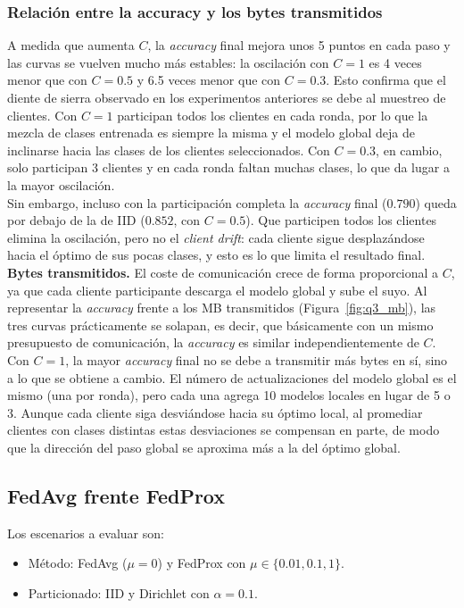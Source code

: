\subsubsection{Relación entre la accuracy y los bytes transmitidos}
A medida que aumenta $C$, la \textit{accuracy} final mejora unos 5 puntos en cada
paso y las curvas se vuelven mucho más estables: la oscilación con $C=1$
es 4 veces menor que con $C=0.5$ y 6.5 veces menor que con $C=0.3$. Esto confirma que el diente de sierra 
observado en los experimentos anteriores se debe al muestreo de clientes. Con $C=1$ participan todos los clientes 
en cada ronda, por lo que la mezcla de clases entrenada es siempre la misma y el modelo global deja de inclinarse 
hacia las clases de los clientes seleccionados. Con $C=0.3$, en cambio, solo participan 3 clientes y en cada ronda 
faltan muchas clases, lo que da lugar a la mayor oscilación.
\\

Sin embargo, incluso con la participación completa la \textit{accuracy} final ($0.790$) queda por debajo de la de
IID ($0.852$, con $C=0.5$). Que participen todos los clientes elimina la oscilación, pero no el \textit{client
drift}: cada cliente sigue desplazándose hacia el óptimo de sus pocas clases, y esto es lo que limita el resultado
final.
\\

\textbf{Bytes transmitidos.} El coste de comunicación crece de forma proporcional a $C$, ya que cada cliente
participante descarga el modelo global y sube el suyo. Al representar la \textit{accuracy} frente a los MB 
transmitidos (Figura~\ref{fig:q3_mb}), las tres curvas prácticamente se solapan, es decir, que básicamente 
con un mismo presupuesto de comunicación, la \textit{accuracy} es similar independientemente de $C$.
\\

Con $C=1$, la mayor \textit{accuracy} final no se debe a transmitir más bytes en sí, sino a lo que se obtiene a
cambio. El número de actualizaciones del modelo global es el mismo (una por ronda), pero cada una agrega 10 modelos
locales en lugar de 5 o 3. Aunque cada cliente siga desviándose hacia su óptimo local, al promediar clientes con
clases distintas estas desviaciones se compensan en parte, de modo que la dirección del paso global se aproxima
más a la del óptimo global.

\subsection{FedAvg frente FedProx}
Los escenarios a evaluar son:
\begin{itemize}
    \item Método: FedAvg ($\mu=0$) y FedProx con $\mu \in \{0.01, 0.1, 1\}$.
    \item Particionado: IID y Dirichlet con $\alpha=0.1$.
\end{itemize}

